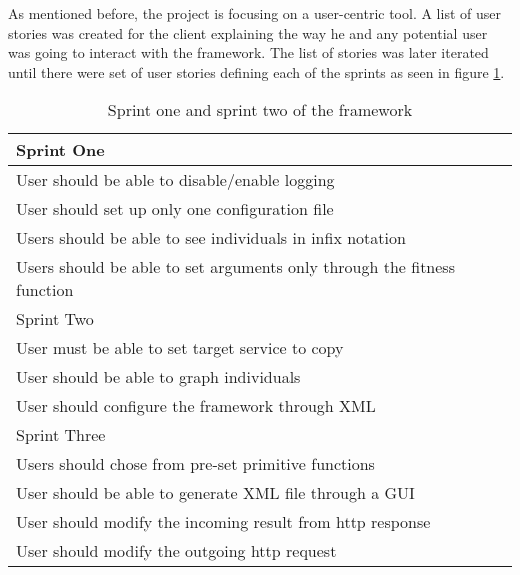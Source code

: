 As mentioned before, the project is focusing on a user-centric tool. A list of user stories was created for the client
explaining the way he and any potential user was going to interact with the framework. The list
of stories was later iterated until there were set of user stories defining each of the sprints
as seen in figure \ref{table:userstories}.
\begin{table}[ht] 
\caption{Sprint one and sprint two of the framework} %
\centering %
\begin{tabular}{l} %
\hline\hline %
Sprint One\\ [0.5ex] %
\hline %
User should be able to disable/enable logging\\
User should set up only one configuration file\\
Users should be able to see individuals in infix notation\\
Users should be able to set arguments only through the fitness function \\

\hline\hline 
Sprint Two\\
\hline
User must be able to set target service to copy\\
User should be able to graph individuals\\
User should configure the framework through XML\\
\hline\hline 
Sprint Three\\
\hline
Users should chose from pre-set primitive functions\\
User should be able to generate XML file through a GUI\\
User should modify the incoming result from http response\\
User should modify the outgoing http request \\
\hline\hline 
\end{tabular} 
\label{table:userstories} %
\end{table}

